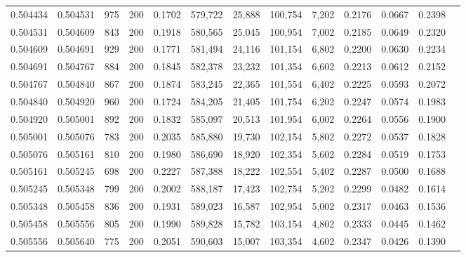 \begin{tabular}{rrrrrrrrrrrrr}
0.504434 & 0.504531 &   975 & 200 &                                     0.1702 & 579,722 &  25,888 & 100,754 &   7,202 & 0.2176 & 0.0667 & 0.2398 \\
0.504531 & 0.504609 &   843 & 200 &                                     0.1918 & 580,565 &  25,045 & 100,954 &   7,002 & 0.2185 & 0.0649 & 0.2320 \\
0.504609 & 0.504691 &   929 & 200 &                                     0.1771 & 581,494 &  24,116 & 101,154 &   6,802 & 0.2200 & 0.0630 & 0.2234 \\
0.504691 & 0.504767 &   884 & 200 &                                     0.1845 & 582,378 &  23,232 & 101,354 &   6,602 & 0.2213 & 0.0612 & 0.2152 \\
0.504767 & 0.504840 &   867 & 200 &                                     0.1874 & 583,245 &  22,365 & 101,554 &   6,402 & 0.2225 & 0.0593 & 0.2072 \\
0.504840 & 0.504920 &   960 & 200 &                                     0.1724 & 584,205 &  21,405 & 101,754 &   6,202 & 0.2247 & 0.0574 & 0.1983 \\
0.504920 & 0.505001 &   892 & 200 &                                     0.1832 & 585,097 &  20,513 & 101,954 &   6,002 & 0.2264 & 0.0556 & 0.1900 \\
0.505001 & 0.505076 &   783 & 200 &                                     0.2035 & 585,880 &  19,730 & 102,154 &   5,802 & 0.2272 & 0.0537 & 0.1828 \\
0.505076 & 0.505161 &   810 & 200 &                                     0.1980 & 586,690 &  18,920 & 102,354 &   5,602 & 0.2284 & 0.0519 & 0.1753 \\
0.505161 & 0.505245 &   698 & 200 &                                     0.2227 & 587,388 &  18,222 & 102,554 &   5,402 & 0.2287 & 0.0500 & 0.1688 \\
0.505245 & 0.505348 &   799 & 200 &                                     0.2002 & 588,187 &  17,423 & 102,754 &   5,202 & 0.2299 & 0.0482 & 0.1614 \\
0.505348 & 0.505458 &   836 & 200 &                                     0.1931 & 589,023 &  16,587 & 102,954 &   5,002 & 0.2317 & 0.0463 & 0.1536 \\
0.505458 & 0.505556 &   805 & 200 &                                     0.1990 & 589,828 &  15,782 & 103,154 &   4,802 & 0.2333 & 0.0445 & 0.1462 \\
0.505556 & 0.505640 &   775 & 200 &                                     0.2051 & 590,603 &  15,007 & 103,354 &   4,602 & 0.2347 & 0.0426 & 0.1390 \\

\end{tabular}
